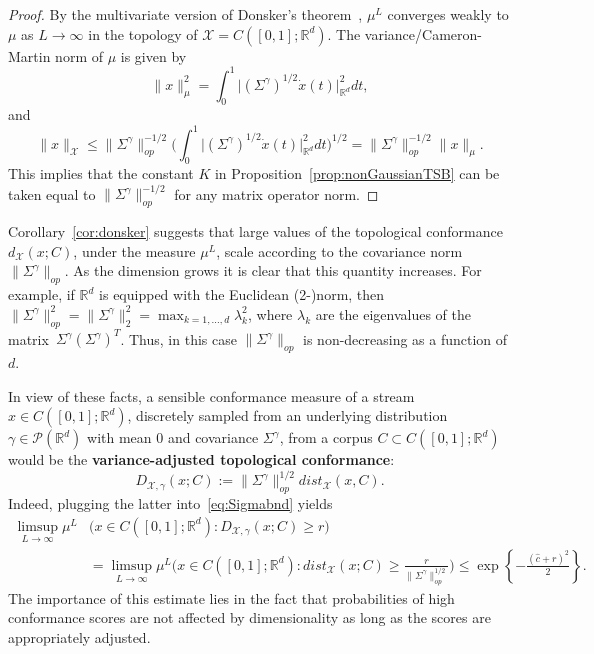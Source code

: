 \documentclass[twoside,11pt]{article}
\numberwithin{equation}{section}
\numberwithin{theorem}{section}
\newcommand{\R}{\mathbb{R}}
\newcommand{\X}{\mathcal{X}}
\begin{document}
\begin{proof} By the multivariate version of Donsker's theorem~\cite[Chapter~XIII, Theorem~1.9]{revuz2013continuous},
$\mu^L$ converges weakly to $\mu$ as $L\to\infty$ in the topology of $\X=C([0,1];\R^d)$. The variance/Cameron-Martin norm of $\mu$ is given by 
$$
\|x\|^2_{\mu}=\int_{0}^{1}\big|(\Sigma^\gamma)^{1/2} \dot{x}(t)\big|_{\R^d}^2dt,
$$
and 
$$\|x\|_{\X}\leq \|\Sigma^\gamma\|^{-1/2}_{op} \bigg(\int_{0}^{1}\big|(\Sigma^\gamma)^{1/2}  \dot{x}(t)\big|_{\R^d}^2dt\bigg)^{1/2}=\|\Sigma^\gamma\|^{-1/2}_{op} \|x\|_{\mu}.
$$
This implies that the constant $K$ in Proposition~\ref{prop:nonGaussianTSB} can be taken equal to $\|\Sigma^\gamma\|^{-1/2}_{op}$ for any matrix operator norm.
\end{proof}

Corollary~\ref{cor:donsker} suggests that large values of the topological conformance 
$d_{\X}(x; C)$, under the measure $\mu^L$, scale according to the covariance norm $\|\Sigma^\gamma\|_{op}$. As the dimension grows it is clear that this quantity increases. For example, if $\R^d$ is equipped with the Euclidean (2-)norm, then $\|\Sigma^\gamma\|^2_{op}=\|\Sigma^\gamma\|^2_2=\max_{k=1,\dots, d}\lambda_k^2$, where $\lambda_k$ are the eigenvalues of the matrix~$\Sigma^\gamma(\Sigma^\gamma)^T$. Thus, in this case $\|\Sigma^\gamma\|_{op}$ is non-decreasing as a function of $d$. 


In view of these facts, a sensible conformance measure of a stream $x\in C([0,1];\R^d)$, discretely sampled from an underlying distribution $\gamma\in\mathscr{P}(\R^d)$ with mean $0$ and covariance $\Sigma^\gamma$,  from a corpus $C\subset C([0,1];\R^d)$ would be the\textbf{ variance-adjusted topological conformance}: 
\begin{equation}\label{eq:Ddef}
    D_{\X, \gamma}(x; C):=\|\Sigma^\gamma\|^{1/2}_{op}dist_{\X}(x, C).
\end{equation}
Indeed, plugging the latter into~\eqref{eq:Sigmabnd} yields
\begin{align*}
\limsup_{L\to\infty}\mu^{L}&\bigg( x\in  C([0,1];\R^d):  D_{\X, \gamma}(x; C)\geq r\bigg)\\&=\limsup_{L\to\infty}\mu^{L}\bigg( x\in  C([0,1];\R^d):  dist_{\X}(x; C) \geq \frac{r}{\|\Sigma^\gamma\|^{1/2}_{op}}\bigg)
\leq \exp\left\{-\frac{(\widehat{c}+r)^2}{2}\right\}.
\end{align*}
The importance of this estimate lies in the fact that probabilities of high conformance scores are not affected by dimensionality as long as the scores are appropriately adjusted.
\end{document}
